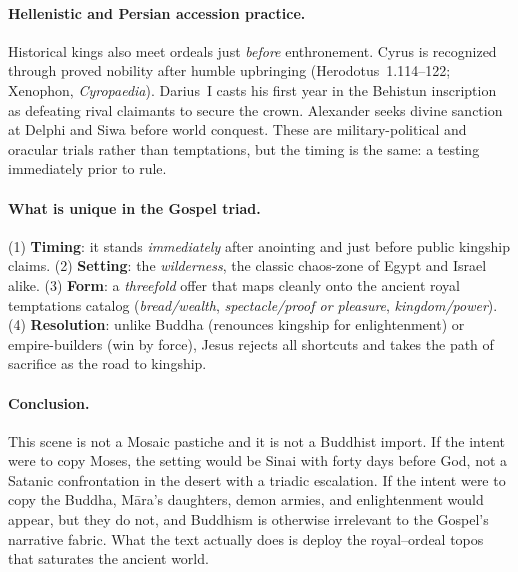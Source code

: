 \paragraph*{Hellenistic and Persian accession practice.}
Historical kings also meet ordeals just \emph{before} enthronement.
Cyrus is recognized through proved nobility after humble upbringing (Herodotus~1.114--122; Xenophon, \emph{Cyropaedia}).
Darius~I casts his first year in the Behistun inscription as defeating rival claimants to secure the crown.
Alexander seeks divine sanction at Delphi and Siwa before world conquest.
These are military-political and oracular trials rather than temptations, but the timing is the same: a testing immediately prior to rule.

\paragraph*{What is unique in the Gospel triad.}
(1) \textbf{Timing}: it stands \emph{immediately} after anointing and just before public kingship claims.
(2) \textbf{Setting}: the \emph{wilderness}, the classic chaos-zone of Egypt and Israel alike.
(3) \textbf{Form}: a \emph{threefold} offer that maps cleanly onto the ancient royal temptations catalog (\emph{bread/wealth}, \emph{spectacle/proof or pleasure}, \emph{kingdom/power}).
(4) \textbf{Resolution}: unlike Buddha (renounces kingship for enlightenment) or empire-builders (win by force), Jesus rejects all shortcuts and takes the path of sacrifice as the road to kingship.

\paragraph*{Conclusion.}
This scene is not a Mosaic pastiche and it is not a Buddhist import.
If the intent were to copy Moses, the setting would be Sinai with forty days before God, not a Satanic confrontation in the desert with a triadic escalation.
If the intent were to copy the Buddha, Māra’s daughters, demon armies, and enlightenment would appear, but they do not, and Buddhism is otherwise irrelevant to the Gospel’s narrative fabric.
What the text actually does is deploy the royal–ordeal topos that saturates the ancient world.


